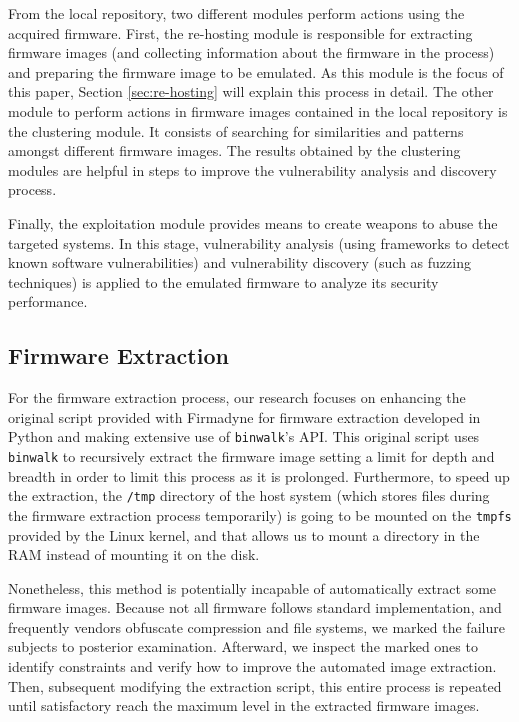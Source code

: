 \documentclass[12pt]{article}
\begin{document}
From the local repository, two different modules perform actions using the acquired firmware. First, the re-hosting module is responsible for extracting firmware images (and collecting information about the firmware in the process) and preparing the firmware image to be emulated. As this module is the focus of this paper, Section \ref{sec:re-hosting} will explain this process in detail. The other module to perform actions in firmware images contained in the local repository is the clustering module. It consists of searching for similarities and patterns amongst different firmware images. The results obtained by the clustering modules are helpful in steps to improve the vulnerability analysis and discovery process.

Finally, the exploitation module provides means to create weapons to abuse the targeted systems. In this stage, vulnerability analysis (using frameworks to detect known software vulnerabilities) and vulnerability discovery (such as fuzzing techniques) is applied to the emulated firmware to analyze its security performance.

\subsection{Firmware Extraction}
\label{sec:extraction}

For the firmware extraction process, our research focuses on enhancing the original script provided with Firmadyne for firmware extraction developed in Python and making extensive use of {\tt binwalk}'s API. This original script uses {\tt binwalk} to recursively extract the firmware image setting a limit for depth and breadth in order to limit this process as it is prolonged. Furthermore, to speed up the extraction, the {\tt /tmp} directory of the host system (which stores files during the firmware extraction process temporarily) is going to be mounted on the {\tt tmpfs} provided by the Linux kernel, and that allows us to mount a directory in the RAM instead of mounting it on the disk.

Nonetheless, this method is potentially incapable of automatically extract some firmware images. Because not all firmware follows standard implementation, and frequently vendors obfuscate compression and file systems, we marked the failure subjects to posterior examination. Afterward, we inspect the marked ones to identify constraints and verify how to improve the automated image extraction. Then, subsequent modifying the extraction script, this entire process is repeated until satisfactory reach the maximum level in the extracted firmware images.
\end{document}

